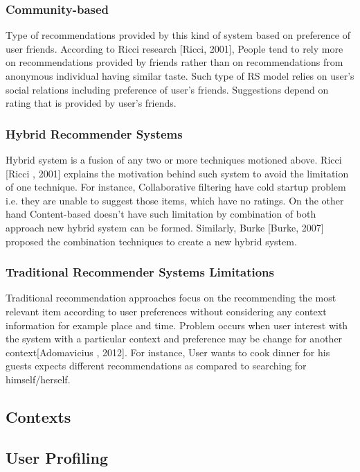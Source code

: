 \subsubsection{Community-based}

Type of recommendations provided by this kind of system based on preference of user friends. According to Ricci research [Ricci, 2001], People tend to rely more on recommendations provided by friends rather than on recommendations from anonymous individual having similar taste. Such type of RS model relies on user’s social relations including preference of user’s friends. Suggestions depend on rating that is provided by user’s friends.

\subsubsection{Hybrid Recommender Systems}

Hybrid system is a fusion of any two or more techniques motioned above. Ricci [Ricci , 2001] explains the motivation behind such system to avoid the limitation of one technique. For instance, Collaborative filtering have cold startup problem i.e. they are unable to suggest those items, which have no ratings. On the other hand Content-based doesn’t have such limitation by combination of both approach new hybrid system can be formed. Similarly, Burke [Burke, 2007] proposed the combination techniques to create a new hybrid system.

\subsubsection{Traditional Recommender Systems Limitations}

Traditional recommendation approaches focus on the recommending the most relevant item according to user preferences without considering any context information for example place and time. Problem occurs when user interest with the system with a particular context and preference may be change for another context[Adomavicius 
, 2012]. For instance, User wants to cook dinner for his guests expects different recommendations as compared to searching for himself/herself.

\subsection{Contexts}

\subsection{User Profiling}

